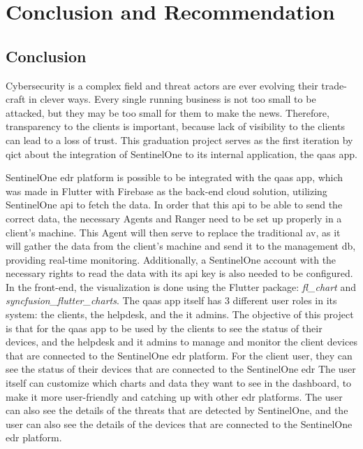 \chapter{Conclusion and Recommendation}

\begin{multicols}{2}

  \section{Conclusion}
  Cybersecurity is a complex field and threat actors are ever evolving their trade-craft in clever ways. Every single
  running business is not too small to be attacked, but they may be too small for them to make the news. Therefore, transparency
  to the clients is important, because lack of visibility to the clients can lead to a loss of trust. This graduation project serves
  as the first iteration by \acrshort{qict} about the integration of SentinelOne to its internal application, the \acrshort{qaas} app.

  SentinelOne \acrshort{edr} platform is possible to be integrated with the \acrshort{qaas} app, which was made in Flutter with
  Firebase as the back-end cloud solution, utilizing SentinelOne \acrshort{api} to fetch the data. In order that this \acrshort{api}
  to be able to send the correct data, the necessary Agents and Ranger need to be set up properly in a client's machine. This Agent will
  then serve to replace the traditional \acrshort{av}, as it will gather the data from the client's machine and send it to the
  management \acrshort{db}, providing real-time monitoring. Additionally, a SentinelOne account with the necessary rights to read the
  data with its \acrshort{api} key is also needed to be configured. In the front-end, the visualization is done using the Flutter
  package: \textit{fl\_chart} and \textit{syncfusion\_flutter\_charts}. The \acrshort{qaas} app itself has 3 different user roles in
  its system: the clients, the helpdesk, and the \acrshort{it} admins. The objective of this project is that for the \acrshort{qaas}
  app to be used by the clients to see the status of their devices, and the helpdesk and \acrshort{it} admins to manage and monitor
  the client devices that are connected to the SentinelOne \acrshort{edr} platform. For the client user, they can see the status of
  their devices that are connected to the SentinelOne \acrshort{edr} The user itself can customize which charts and data they want to
  see in the dashboard, to make it more user-friendly and catching up with other \acrshort{edr} platforms. The user can also see the
  details of the threats that are detected by SentinelOne, and the user can also see the details of the devices that are connected to
  the SentinelOne
  \acrshort{edr} platform.


\end{multicols}
